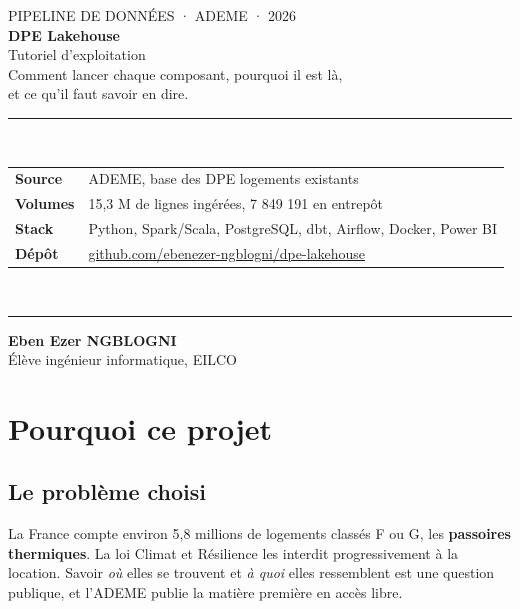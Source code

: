 \documentclass[11pt,a4paper]{article}
\begin{document}
\begin{titlepage}
\thispagestyle{empty}
\vspace*{2.5cm}
{\color{encre3}\small\ttfamily PIPELINE DE DONNÉES · ADEME · 2026}\\[1.2em]
{\Huge\bfseries\color{encre} DPE Lakehouse}\\[0.5em]
{\LARGE\color{encre2} Tutoriel d'exploitation}\\[2em]
{\large\color{encre2} Comment lancer chaque composant, pourquoi il est là,\\ et ce qu'il faut savoir en dire.}\\[3em]

\color{trait}\rule{\textwidth}{0.8pt}\\[1em]
\color{encre2}
\begin{tabularx}{\textwidth}{@{}lX@{}}
\textbf{Source} & ADEME, base des DPE logements existants \\[0.3em]
\textbf{Volumes} & 15,3 M de lignes ingérées, 7 849 191 en entrepôt \\[0.3em]
\textbf{Stack} & Python, Spark/Scala, PostgreSQL, dbt, Airflow, Docker, Power BI \\[0.3em]
\textbf{Dépôt} & \href{https://github.com/ebenezer-ngblogni/dpe-lakehouse}{github.com/ebenezer-ngblogni/dpe-lakehouse} \\
\end{tabularx}\\[1em]
\color{trait}\rule{\textwidth}{0.8pt}

\vfill
{\color{encre}\large\bfseries Eben Ezer NGBLOGNI}\\
{\color{encre3} Élève ingénieur informatique, EILCO}
\end{titlepage}

\tableofcontents
\newpage

\section{Pourquoi ce projet}

\subsection{Le problème choisi}

La France compte environ 5,8 millions de logements classés F ou G, les
\textbf{passoires thermiques}. La loi Climat et Résilience les interdit
progressivement à la location. Savoir \emph{où} elles se trouvent et
\emph{à quoi} elles ressemblent est une question publique, et l'ADEME publie
la matière première en accès libre.
\end{document}
